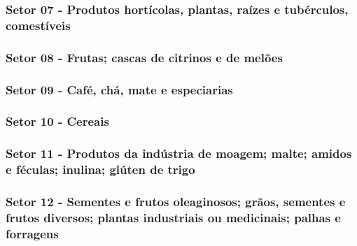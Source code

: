  



\newpage

\subsubsection{Setor 07 - Produtos hortícolas, plantas, raízes e tubérculos, comestíveis}


 

\newpage

\subsubsection{Setor 08 - Frutas; cascas de citrinos e de melões}


 

\newpage

\subsubsection{Setor 09 - Café, chá, mate e especiarias}


 


\newpage

\subsubsection{Setor 10 - Cereais}





\subsubsection{Setor 11 - Produtos da indústria de moagem; malte; amidos e féculas; inulina; glúten de trigo}





\subsubsection{Setor 12 - Sementes e frutos oleaginosos; grãos, sementes e frutos diversos; plantas industriais ou medicinais; palhas e forragens}






